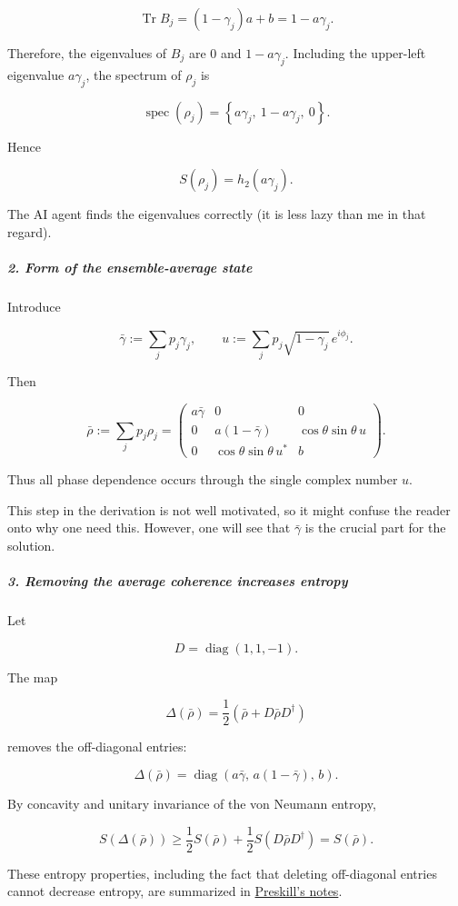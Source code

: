 \[
\operatorname{Tr}B_j=(1-\gamma_j)a+b=1-a\gamma_j.
\]

Therefore, the eigenvalues of $B_j$ are $0$ and $1-a\gamma_j$. Including the upper-left eigenvalue $a\gamma_j$, the spectrum of $\rho_j$ is

\[
\operatorname{spec}(\rho_j) = \left\{a\gamma_j,\ 1-a\gamma_j,\ 0\right\}.
\]

Hence

\[
S(\rho_j)=h_2(a\gamma_j).
\]

{
\color{blue}
The AI agent finds the eigenvalues correctly (it is less lazy than me in that regard).
}

\subparagraph*{2. Form of the ensemble-average state}

Introduce

\[
\bar\gamma:=\sum_jp_j\gamma_j, \qquad u:=\sum_jp_j\sqrt{1-\gamma_j}\,e^{i\phi_j}.
\]

Then

\[
\bar\rho:=\sum_jp_j\rho_j
=
\begin{pmatrix}
a\bar\gamma&0&0\\
0&a(1-\bar\gamma)&\cos\theta\sin\theta\,u\\
0&\cos\theta\sin\theta\,u^*&b
\end{pmatrix}.
\]

Thus all phase dependence occurs through the single complex number $u$.

{
\color{blue}
This step in the derivation is not well motivated, so it might confuse the reader onto why one need this. However, one will see that $\bar\gamma$ is the crucial part for the solution. 
}

\subparagraph*{3. Removing the average coherence increases entropy}

Let

\[
D=\operatorname{diag}(1,1,-1).
\]

The map

\[
\Delta(\bar\rho) = \frac{1}{2}\left(\bar\rho+D\bar\rho D^\dagger\right)
\]

removes the off-diagonal entries:

\[
\Delta(\bar\rho) = \operatorname{diag}\left( a\bar\gamma,\, a(1-\bar\gamma),\, b \right).
\]

By concavity and unitary invariance of the von Neumann entropy,

\[
S(\Delta(\bar\rho)) \geq \frac12S(\bar\rho)+\frac12S(D\bar\rho D^\dagger) =S(\bar\rho).
\]

These entropy properties, including the fact that deleting off-diagonal entries cannot decrease entropy, are summarized in \href{\detokenize{https://www.preskill.caltech.edu/ph229/notes/chap5.pdf}}{Preskill's notes}.

